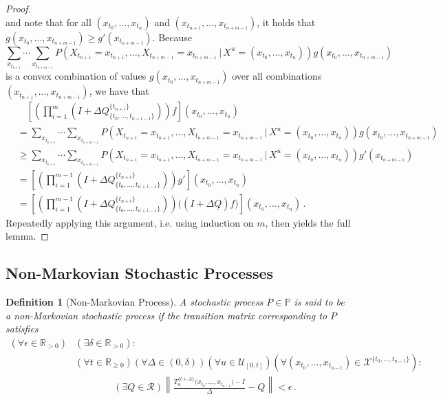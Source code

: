 \documentclass[10pt]{paper}
\newtheorem{definition}{Definition}
\newcommand{\reals}{\mathbb{R}}
\newcommand{\realspos}{\reals_{>0}}
\newcommand{\realsnonneg}{\reals_{\geq 0}}
\newcommand{\states}{\mathcal{X}}
\newcommand{\lrate}{\underline{Q}}
\newcommand{\norm}[1]{\left\lVert #1 \right\rVert}
\begin{document}
\begin{proof}
\begin{equation*}
\end{equation*}
and note that for all $(x_{t_0},\ldots,x_{t_n})$ and $(x_{t_{n+1}},\ldots,x_{t_{n+m-1}})$, it holds that $g(x_{t_0},\ldots,x_{t_{n+m-1}}) \geq g'(x_{t_{n+m-1}})$.
Because
\begin{equation*}
\sum_{x_{t_{n+1}}}\cdots\sum_{x_{t_{n+m-1}}} P\left(X_{t_{n+1}}=x_{t_{n+1}},\ldots,X_{t_{n+m-1}}=x_{t_{n+m-1}}\,\vert\,X^u=(x_{t_0},\ldots,x_{t_n})\right)g(x_{t_0},\ldots,x_{t_{n+m-1}})
\end{equation*}
is a convex combination of values $g(x_{t_0},\ldots,x_{t_{n+m-1}})$ over all combinations $(x_{t_{n+1}},\ldots,x_{t_{n+m-1}})$, we have that
\begin{align*}
&\quad \left[\left(\prod_{i=1}^m \left(I + \Delta Q_{\{t_0,\ldots,t_{n+i-1}\}}^{\{t_{n+i}\}} \right)\right)f\right](x_{t_0},\ldots,x_{t_n}) \\
&= \sum_{x_{t_{n+1}}}\cdots\sum_{x_{t_{n+m-1}}} P\left(X_{t_{n+1}}=x_{t_{n+1}},\ldots,X_{t_{n+m-1}}=x_{t_{n+m-1}}\,\vert\,X^u=(x_{t_0},\ldots,x_{t_n})\right)g(x_{t_0},\ldots,x_{t_{n+m-1}}) \\
&\geq \sum_{x_{t_{n+1}}}\cdots\sum_{x_{t_{n+m-1}}} P\left(X_{t_{n+1}}=x_{t_{n+1}},\ldots,X_{t_{n+m-1}}=x_{t_{n+m-1}}\,\vert\,X^u=(x_{t_0},\ldots,x_{t_n})\right)g'(x_{t_{n+m-1}}) \\
&= \left[\left(\prod_{i=1}^{m-1} \left(I + \Delta Q_{\{t_0,\ldots,t_{n+i-1}\}}^{\{t_{n+i}\}} \right)\right)g'\right](x_{t_0},\ldots,x_{t_n}) \\
&= \left[\left(\prod_{i=1}^{m-1} \left(I + \Delta Q_{\{t_0,\ldots,t_{n+i-1}\}}^{\{t_{n+i}\}} \right)\right)\bigl(\left(I + \Delta\lrate\right)f\bigr)\right](x_{t_0},\ldots,x_{t_n})\,.
\end{align*}
Repeatedly applying this argument, i.e. using induction on $m$, then yields the full lemma.
\end{proof}

\subsection{Non-Markovian Stochastic Processes}

\begin{definition}[Non-Markovian Process]\label{def:nonmarkov_process}
A stochastic process $P\in\mathbb{P}$ is said to be a \emph{non-Markovian stochastic process} if the transition matrix corresponding to $P$ satisfies
\begin{align*}
(\forall \epsilon\in\realspos)&(\exists \delta\in\realspos): \\
&(\forall t\in\realsnonneg)(\forall \Delta\in(0,\delta))(\forall u\in\mathcal{U}_{[0,t]})(\forall (x_{t_0},\ldots,x_{t_{n-1}})\in\states^{\{t_0,\ldots,t_{n-1}\}}): \\
&\quad\quad\quad\quad(\exists Q\in\mathcal{R})\norm{\frac{T_u^{\{t+\Delta\}}\bigl(x_{t_0},\ldots,x_{t_{n-1}}\bigr) - I}{\Delta} - Q} < \epsilon\,.
\end{align*}
\end{definition}
\end{document}
